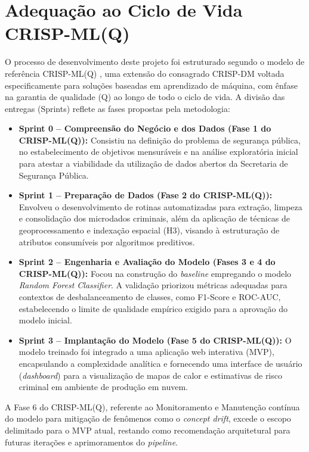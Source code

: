 \documentclass[12pt]{article}
\begin{document}
\section{Adequação ao Ciclo de Vida CRISP-ML(Q)}
O processo de desenvolvimento deste projeto foi estruturado segundo o modelo de referência CRISP-ML(Q) \cite{studer2021}, uma extensão do consagrado CRISP-DM voltada especificamente para soluções baseadas em aprendizado de máquina, com ênfase na garantia de qualidade (Q) ao longo de todo o ciclo de vida. A divisão das entregas (Sprints) reflete as fases propostas pela metodologia:

\begin{itemize}
    \item \textbf{Sprint 0 -- Compreensão do Negócio e dos Dados (Fase 1 do CRISP-ML(Q)):} Consistiu na definição do problema de segurança pública, no estabelecimento de objetivos mensuráveis e na análise exploratória inicial para atestar a viabilidade da utilização de dados abertos da Secretaria de Segurança Pública.
    \item \textbf{Sprint 1 -- Preparação de Dados (Fase 2 do CRISP-ML(Q)):} Envolveu o desenvolvimento de rotinas automatizadas para extração, limpeza e consolidação dos microdados criminais, além da aplicação de técnicas de geoprocessamento e indexação espacial (H3), visando à estruturação de atributos consumíveis por algoritmos preditivos.
    \item \textbf{Sprint 2 -- Engenharia e Avaliação do Modelo (Fases 3 e 4 do CRISP-ML(Q)):} Focou na construção do \textit{baseline} empregando o modelo \textit{Random Forest Classifier}. A validação priorizou métricas adequadas para contextos de desbalanceamento de classes, como F1-Score e ROC-AUC, estabelecendo o limite de qualidade empírico exigido para a aprovação do modelo inicial.
    \item \textbf{Sprint 3 -- Implantação do Modelo (Fase 5 do CRISP-ML(Q)):} O modelo treinado foi integrado a uma aplicação web interativa (MVP), encapsulando a complexidade analítica e fornecendo uma interface de usuário (\textit{dashboard}) para a visualização de mapas de calor e estimativas de risco criminal em ambiente de produção em nuvem.
\end{itemize}

A Fase 6 do CRISP-ML(Q), referente ao Monitoramento e Manutenção contínua do modelo para mitigação de fenômenos como o \textit{concept drift}, excede o escopo delimitado para o MVP atual, restando como recomendação arquitetural para futuras iterações e aprimoramentos do \textit{pipeline}.
\end{document}
